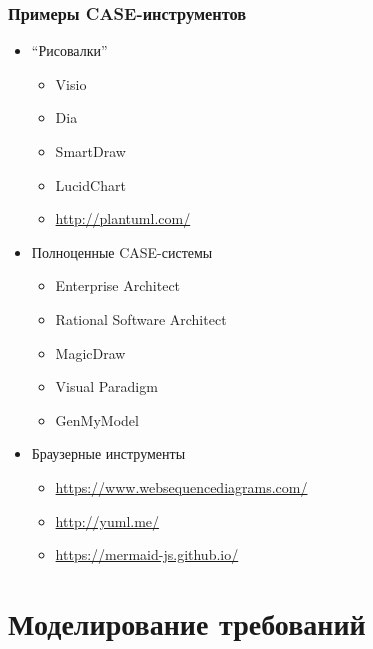 \documentclass{../../slides-style}
\begin{document}
    \begin{frame}
        \frametitle{Примеры CASE-инструментов}
        \begin{itemize}
            \item ``Рисовалки''
            \begin{itemize}
                \item Visio
                \item Dia
                \item SmartDraw
                \item LucidChart
                \item \url{http://plantuml.com/}
            \end{itemize}
            \item Полноценные CASE-системы
            \begin{itemize}
                \item Enterprise Architect
                \item Rational Software Architect
                \item MagicDraw
                \item Visual Paradigm
                \item GenMyModel
            \end{itemize}
            \item Браузерные инструменты
            \begin{itemize}
                \item \url{https://www.websequencediagrams.com/}
                \item \url{http://yuml.me/}
		\item \url{https://mermaid-js.github.io/}
            \end{itemize}
        \end{itemize}
    \end{frame}

    \section{Моделирование требований}
\end{document}
